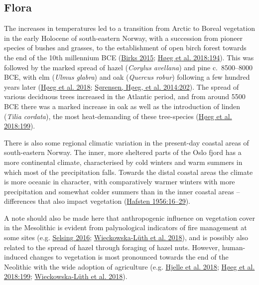 \documentclass[
  12pt,
  a4paper,
  oneside]{book}
\begin{document}
\hypertarget{flora}{%
\subsection{Flora}\label{flora}}

The increases in temperatures led to a transition from Arctic to Boreal vegetation in the early Holocene of south-eastern Norway, with a succession from pioneer species of bushes and grasses, to the establishment of open birch forest towards the end of the 10th millennium BCE (\protect\hyperlink{ref-birks2015}{Birks 2015}; \protect\hyperlink{ref-huxf8eg2018}{Høeg et al. 2018:194}). This was followed by the marked spread of hazel (\emph{Corylus avellana}) and pine c.~8500--8000 BCE, with elm (\emph{Ulmus glabra}) and oak (\emph{Quercus robur}) following a few hundred years later (\protect\hyperlink{ref-huxf8eg2018}{Høeg et al. 2018}; \protect\hyperlink{ref-suxf8rensen2014b}{Sørensen, Høeg, et al. 2014:202}). The spread of various deciduous trees increased in the Atlantic period, and from around 5500 BCE there was a marked increase in oak as well as the introduction of linden (\emph{Tilia cordata}), the most heat-demanding of these tree-species (\protect\hyperlink{ref-huxf8eg2018}{Høeg et al. 2018:199}).

There is also some regional climatic variation in the present-day coastal areas of south-eastern Norway. The inner, more sheltered parts of the Oslo fjord has a more continental climate, characterised by cold winters and warm summers in which most of the precipitation falls. Towards the distal coastal areas the climate is more oceanic in character, with comparatively warmer winters with more precipitation and somewhat colder summers than in the inner coastal areas -- differences that also impact vegetation (\protect\hyperlink{ref-hafsten1956}{Hafsten 1956:16--29}).

A note should also be made here that anthropogenic influence on vegetation cover in the Mesolithic is evident from palynological indicators of fire management at some sites (e.g. \protect\hyperlink{ref-selsing2016}{Selsing 2016}; \protect\hyperlink{ref-wieckowska-luth2018}{Wieckowska-Lüth et al. 2018}), and is possibly also related to the spread of hazel through foraging of hazel nuts. However, human-induced changes to vegetation is most pronounced towards the end of the Neolithic with the wide adoption of agriculture (e.g. \protect\hyperlink{ref-hjelle2018}{Hjelle et al. 2018}; \protect\hyperlink{ref-huxf8eg2018}{Høeg et al. 2018:199}; \protect\hyperlink{ref-wieckowska-luth2018}{Wieckowska-Lüth et al. 2018}).
\end{document}
